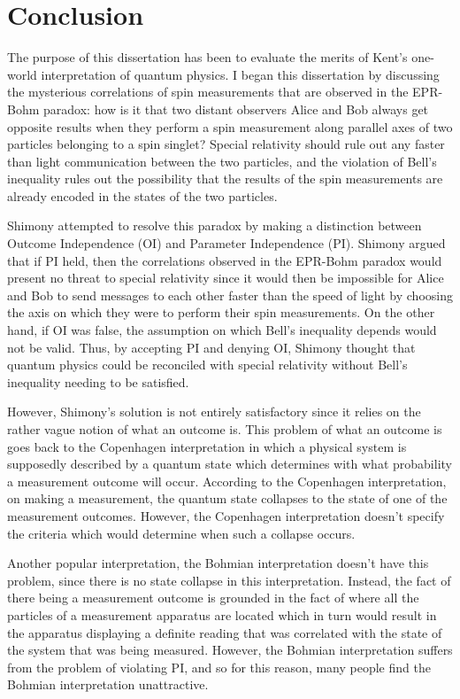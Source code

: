 \documentclass[12pt]{report}
\begin{document}
\chapter*{Conclusion}
The purpose of this dissertation has been to evaluate the merits of Kent's one-world interpretation of quantum physics. I began this dissertation by discussing the mysterious correlations of spin measurements that are observed in the EPR-Bohm paradox: how is it that two distant observers Alice and Bob always get opposite results when they perform a spin measurement along parallel axes of two particles belonging to a spin singlet? Special relativity should rule out any faster than light communication between the two particles, and the violation of Bell's inequality rules out the possibility that the results of the spin measurements are already encoded in the states of the two particles.
 
Shimony attempted to resolve this paradox by making a distinction between Outcome Independence (OI) and Parameter Independence (PI). Shimony argued that if PI held, then the correlations observed in the EPR-Bohm paradox would present no threat to special relativity since it would then be impossible for Alice and Bob to send messages to each other faster than the speed of light by choosing the axis on which they were to perform their spin measurements. On the other hand, if OI was false, the assumption on which Bell's inequality depends would not be valid. Thus, by accepting PI and denying OI, Shimony thought that quantum physics could be reconciled with special relativity without Bell's inequality needing to be satisfied. 

However, Shimony's solution is not entirely satisfactory since it relies on the rather vague notion of what an outcome is. This problem of what an outcome is goes back to the Copenhagen interpretation in which a physical system is supposedly described by a quantum state which determines with what probability a measurement outcome will occur. According to the Copenhagen interpretation, on making a measurement, the quantum state collapses to the state of one of the measurement outcomes. However, the Copenhagen interpretation doesn't specify the criteria which would determine when such a collapse occurs. 

Another popular interpretation, the Bohmian interpretation doesn't have this problem, since there is no state collapse in this interpretation. Instead, the fact of there being a measurement outcome is grounded in the fact of where all the particles of a measurement apparatus are located which in turn would result in the apparatus displaying a definite reading that was correlated with the state of the system that was being measured.  However, the Bohmian interpretation suffers from the problem of violating PI, and so for this reason, many people find the Bohmian interpretation unattractive. 
\end{document}
